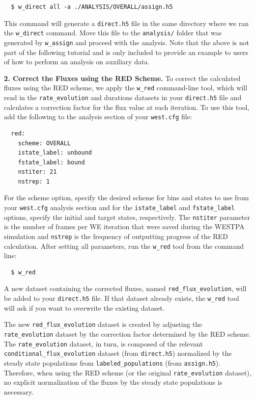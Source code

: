 \begin{verbatim}
  $ w_direct all -a ./ANALYSIS/OVERALL/assign.h5
\end{verbatim}

This command will generate a \verb|direct.h5| file in the same directory where we ran the \verb|w_direct| command.
Move this file to the \verb|analysis/| folder that was generated by \verb|w_assign| and proceed with the analysis.
Note that the above is not part of the following tutorial and is only included to provide an example to users of how to perform an analysis on auxiliary data.

\textbf{2. Correct the Fluxes using the RED Scheme.} To correct the calculated fluxes using the RED scheme, we apply the \verb|w_red| command-line tool, which will read in the \verb|rate_evolution| and durations datasets in your \verb|direct.h5| file and calculates a correction factor for the flux value at each iteration.
To use this tool, add the following to the analysis section of your \verb|west.cfg| file:
\begin{verbatim}
  red:
    scheme: OVERALL
    istate_label: unbound
    fstate_label: bound
    nstiter: 21
    nstrep: 1
\end{verbatim}

\noindent For the scheme option, specify  the desired scheme for bins and states to use from your \verb|west.cfg| analysis section and for the \verb|istate_label| and \verb|fstate_label| options, specify the initial and target states, respectively.
The \verb|nstiter| parameter is the number of frames per WE iteration that were saved during the WESTPA simulation and \verb|nstrep| is the frequency of outputting progress of the RED calculation. After setting all parameters, run the \verb|w_red| tool from the command line:

\begin{verbatim}
  $ w_red
\end{verbatim}

\noindent A new dataset containing the corrected fluxes, named \verb|red_flux_evolution|, will be added to your \verb|direct.h5| file.
If that dataset already exists, the \verb|w_red| tool will ask if you want to overwrite the existing dataset.

The new \verb|red_flux_evolution| dataset is created by adjusting the \verb|rate_evolution| dataset by the correction factor determined by the RED scheme.
The \verb|rate_evolution| dataset, in turn, is composed of the relevant \verb|conditional_flux_evolution| dataset (from \verb|direct.h5|) normalized by the steady state populations from \verb|labeled_populations| (from \verb|assign.h5|).
Therefore, when using the RED scheme (or the original \verb|rate_evolution| dataset), no explicit normalization of the fluxes by the steady state populations is necessary.

